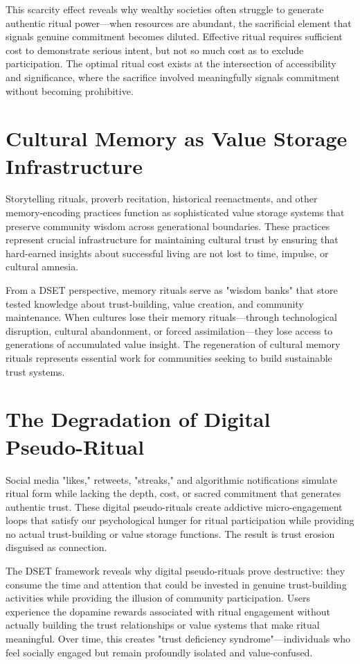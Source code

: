 \documentclass[11pt,oneside]{book}
\begin{document}
This scarcity effect reveals why wealthy societies often struggle to generate authentic ritual power—when resources are abundant, the sacrificial element that signals genuine commitment becomes diluted. Effective ritual requires sufficient cost to demonstrate serious intent, but not so much cost as to exclude participation. The optimal ritual cost exists at the intersection of accessibility and significance, where the sacrifice involved meaningfully signals commitment without becoming prohibitive.

\section{Cultural Memory as Value Storage Infrastructure}

Storytelling rituals, proverb recitation, historical reenactments, and other memory-encoding practices function as sophisticated value storage systems that preserve community wisdom across generational boundaries. These practices represent crucial infrastructure for maintaining cultural trust by ensuring that hard-earned insights about successful living are not lost to time, impulse, or cultural amnesia.

From a DSET perspective, memory rituals serve as "wisdom banks" that store tested knowledge about trust-building, value creation, and community maintenance. When cultures lose their memory rituals—through technological disruption, cultural abandonment, or forced assimilation—they lose access to generations of accumulated value insight. The regeneration of cultural memory rituals represents essential work for communities seeking to build sustainable trust systems.

\section{The Degradation of Digital Pseudo-Ritual}

Social media "likes," retweets, "streaks," and algorithmic notifications simulate ritual form while lacking the depth, cost, or sacred commitment that generates authentic trust. These digital pseudo-rituals create addictive micro-engagement loops that satisfy our psychological hunger for ritual participation while providing no actual trust-building or value storage functions. The result is trust erosion disguised as connection.

The DSET framework reveals why digital pseudo-rituals prove destructive: they consume the time and attention that could be invested in genuine trust-building activities while providing the illusion of community participation. Users experience the dopamine rewards associated with ritual engagement without actually building the trust relationships or value systems that make ritual meaningful. Over time, this creates "trust deficiency syndrome"—individuals who feel socially engaged but remain profoundly isolated and value-confused.
\end{document}
